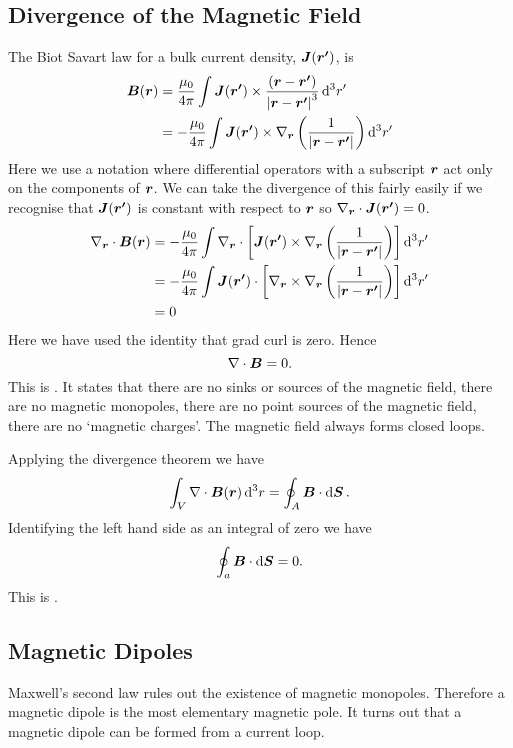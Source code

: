     \subsection{Divergence of the Magnetic Field}
    The Biot Savart law for a bulk current density, \(\bm{J}(\bm{r'})\), is
    \begin{align*}
        \bm{B}(\bm{r}) &= \frac{\mu_0}{4\pi} \int \bm{J}(\bm{r'}) \times \frac{(\bm{r} - \bm{r'})}{\abs{\bm{r} - \bm{r'}}^3} \dd[3]{r'}\\
        &= -\frac{\mu_0}{4\pi} \int \bm{J}(\bm{r'}) \times \nabla_{\bm{r}}\left(\frac{1}{\abs{\bm{r} - \bm{r'}}}\right) \dd[3]{r'}
    \end{align*}
    Here we use a notation where differential operators with a subscript \(\bm{r}\) act only on the components of \(\bm{r}\).
    We can take the divergence of this fairly easily if we recognise that \(\bm{J}(\bm{r'})\) is constant with respect to \(\bm{r}\) so \(\nabla_{\bm{r}}\cdot\bm{J}(\bm{r'}) = 0\).
    \begin{align*}
        \nabla_{\bm{r}}\cdot\bm{B}(\bm{r}) &= -\frac{\mu_0}{4\pi} \int \nabla_{\bm{r}}\cdot \left[\bm{J}(\bm{r'}) \times \nabla_{\bm{r}}\left(\frac{1}{\abs{\bm{r} - \bm{r'}}}\right)\right] \dd[3]{r'}\\
        &= -\frac{\mu_0}{4\pi} \int \bm{J}(\bm{r'}) \cdot\left[\nabla_{\bm{r}} \times \nabla_{\bm{r}}\left(\frac{1}{\abs{\bm{r} - \bm{r'}}}\right)\right] \dd[3]{r'}\\
        &= 0
    \end{align*}
    Here we have used the identity that grad curl is zero.
    Hence
    \[\nabla\cdot\bm{B} = 0.\]
    This is .
    It states that there are no sinks or sources of the magnetic field,
    there are no magnetic monopoles, there are no point sources of the magnetic field, there are no `magnetic charges'.
    The magnetic field always forms closed loops.
    
    Applying the divergence theorem we have
    \[\int_V \nabla\cdot\bm{B}(\bm{r})\dd[3]{r} = \oint_A\bm{B}\cdot\dd{\bm{S}}.\]
    Identifying the left hand side as an integral of zero we have
    \[\oint_a\bm{B}\cdot\dd{\bm{S}} = 0.\]
    This is .
    
    \subsection{Magnetic Dipoles}
    Maxwell's second law rules out the existence of magnetic monopoles.
    Therefore a magnetic dipole is the most elementary magnetic pole.
    It turns out that a magnetic dipole can be formed from a current loop.
    
